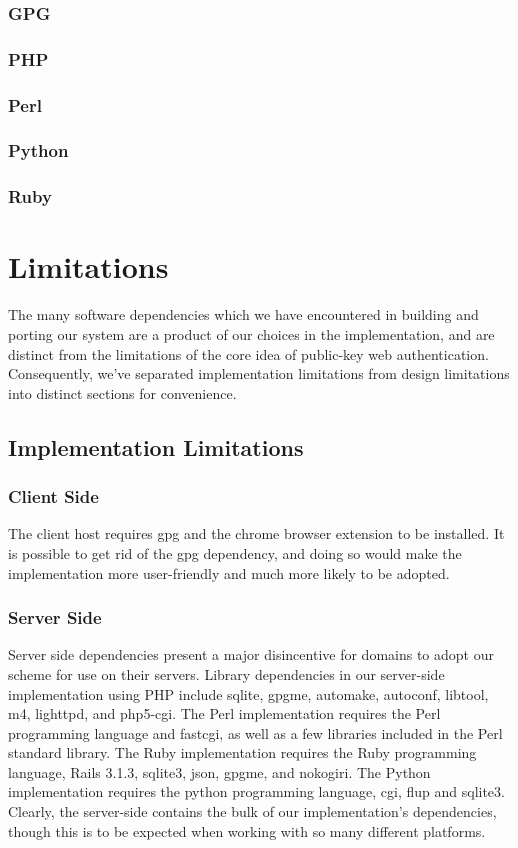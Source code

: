 \documentclass[11pt]{article}
\begin{document}
\subsubsection{GPG}
\subsubsection{PHP}
\subsubsection{Perl}
\subsubsection{Python}
\subsubsection{Ruby}

\section{Limitations} \label{sec:limitations}
The many software dependencies which we have encountered in building and porting our system are a product of our choices in the implementation, and are distinct from the limitations of the core idea of public-key web authentication.  Consequently, we've separated implementation limitations from design limitations into distinct sections for convenience.

\subsection{Implementation Limitations}
\subsubsection{Client Side}
The client host requires gpg and the chrome browser extension to be installed.  It is possible to get rid of the gpg dependency, and doing so would make the implementation more user-friendly and much more likely to be adopted.
\subsubsection{Server Side}
Server side dependencies present a major disincentive for domains to adopt our scheme for use on their servers.  Library dependencies in our server-side implementation using PHP include sqlite, gpgme, automake, autoconf, libtool, m4, lighttpd, and php5-cgi.  The Perl implementation requires the Perl programming language and fastcgi, as well as a few libraries included in the Perl standard library.  The Ruby implementation requires the Ruby programming language, Rails 3.1.3, sqlite3, json, gpgme, and nokogiri.  The Python implementation requires the python programming language, cgi, flup and sqlite3.  Clearly, the server-side contains the bulk of our implementation's dependencies, though this is to be expected when working with so many different platforms.
\end{document}
